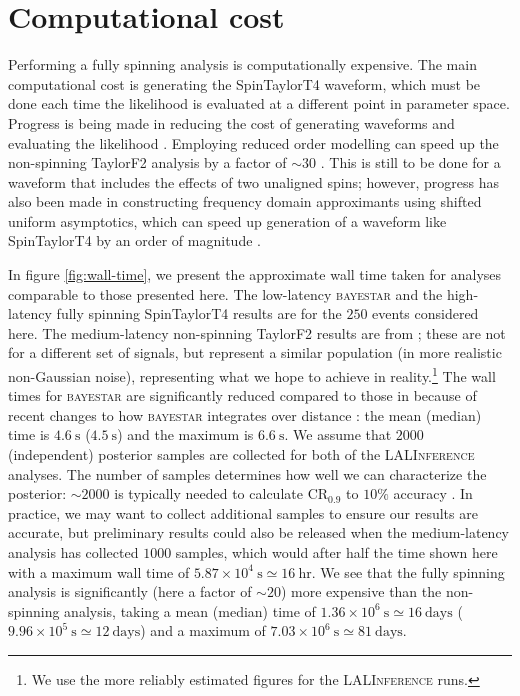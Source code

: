 \appendix

\section{Computational cost}\label{ap:CPU}

Performing a fully spinning analysis is computationally expensive. The main computational cost is generating the SpinTaylorT4 waveform, which must be done each time the likelihood is evaluated at a different point in parameter space. Progress is being made in reducing the cost of generating waveforms and evaluating the likelihood \citep[e.g.,][]{Canizares_2013,P_rrer_2014}. Employing reduced order modelling can speed up the non-spinning TaylorF2 analysis by a factor of $\sim 30$ \citep{Canizares_2015}. This is still to be done for a waveform that includes the effects of two unaligned spins; however, progress has also been made in constructing frequency domain approximants using shifted uniform asymptotics, which can speed up generation of a waveform like SpinTaylorT4 by an order of magnitude \citep{Klein:2014bua}.

In figure \ref{fig:wall-time}, we present the approximate wall time taken for analyses comparable to those presented here. The low-latency \textsc{bayestar} and the high-latency fully spinning SpinTaylorT4 results are for the $250$ events considered here. The medium-latency non-spinning TaylorF2 results are from \citet{Berry_2014}; these are not for a different set of signals, but represent a similar population (in more realistic non-Gaussian noise), representing what we hope to achieve in reality.\footnote{We use the more reliably estimated figures for the \textsc{LALInference} runs.} The wall times for \textsc{bayestar} are significantly reduced compared to those in \citet{Berry_2014} because of recent changes to how \textsc{bayestar} integrates over distance \citep{Singer:2015ema}: the mean (median) time is $4.6~\mathrm{s}$ ($4.5~\mathrm{s}$) and the maximum is $6.6~\mathrm{s}$.  We assume that $2000$ (independent) posterior samples are collected for both of the \textsc{LALInference} analyses. The number of samples determines how well we can characterize the posterior: $\sim2000$ is typically needed to calculate $\mathrm{CR}_{0.9}$ to $10\%$ accuracy \citep{DelPozzo_2015}. In practice, we may want to collect additional samples to ensure our results are accurate, but preliminary results could also be released when the medium-latency analysis has collected $1000$ samples, which would after half the time shown here with a maximum wall time of $5.87\times10^4~\mathrm{s} \simeq 16~\mathrm{hr}$. We see that the fully spinning analysis is significantly (here a factor of $\sim20$) more expensive than the non-spinning analysis, taking a mean (median) time of $1.36\times10^6~\mathrm{s} \simeq 16~\mathrm{days}$ ($9.96\times10^5~\mathrm{s} \simeq 12~\mathrm{days}$) and a maximum of $7.03\times10^6~\mathrm{s} \simeq 81~\mathrm{days}$.

